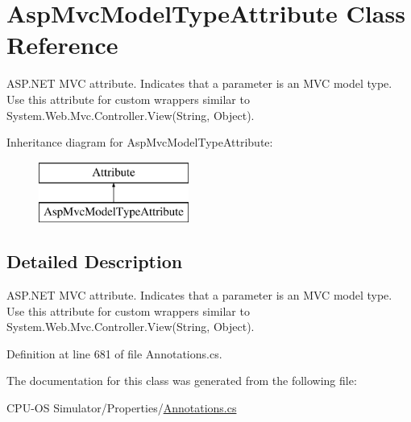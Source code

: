 \hypertarget{class_asp_mvc_model_type_attribute}{}\section{Asp\+Mvc\+Model\+Type\+Attribute Class Reference}
\label{class_asp_mvc_model_type_attribute}


A\+S\+P.\+N\+E\+T M\+V\+C attribute. Indicates that a parameter is an M\+V\+C model type. Use this attribute for custom wrappers similar to {\ttfamily System.\+Web.\+Mvc.\+Controller.\+View(\+String, Object)}.  


Inheritance diagram for Asp\+Mvc\+Model\+Type\+Attribute\+:\begin{figure}[H]
\begin{center}
\leavevmode
\includegraphics[height=2.000000cm]{class_asp_mvc_model_type_attribute}
\end{center}
\end{figure}


\subsection{Detailed Description}
A\+S\+P.\+N\+E\+T M\+V\+C attribute. Indicates that a parameter is an M\+V\+C model type. Use this attribute for custom wrappers similar to {\ttfamily System.\+Web.\+Mvc.\+Controller.\+View(\+String, Object)}. 



Definition at line 681 of file Annotations.\+cs.



The documentation for this class was generated from the following file\+:\begin{DoxyCompactItemize}
\item 
C\+P\+U-\/\+O\+S Simulator/\+Properties/\hyperlink{_annotations_8cs}{Annotations.\+cs}\end{DoxyCompactItemize}
